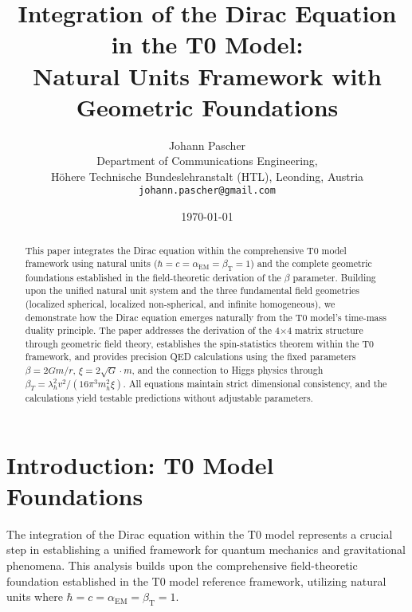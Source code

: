 \documentclass[12pt,a4paper]{article}
\begin{document}
	
	\title{Integration of the Dirac Equation in the T0 Model: \\Natural Units Framework with Geometric Foundations}
	\author{Johann Pascher\\
		Department of Communications Engineering, \\Höhere Technische Bundeslehranstalt (HTL), Leonding, Austria\\
		\texttt{johann.pascher@gmail.com}}
	\date{\today}
	
	\maketitle
	
	\begin{abstract}
		This paper integrates the Dirac equation within the comprehensive T0 model framework using natural units ($\hbar = c = \alpha_{\text{EM}} = \beta_{\text{T}} = 1$) and the complete geometric foundations established in the field-theoretic derivation of the $\beta$ parameter. Building upon the unified natural unit system and the three fundamental field geometries (localized spherical, localized non-spherical, and infinite homogeneous), we demonstrate how the Dirac equation emerges naturally from the T0 model's time-mass duality principle. The paper addresses the derivation of the 4×4 matrix structure through geometric field theory, establishes the spin-statistics theorem within the T0 framework, and provides precision QED calculations using the fixed parameters $\beta = 2Gm/r$, $\xi = 2\sqrt{G} \cdot m$, and the connection to Higgs physics through $\beta_T = \lambda_h^2 v^2/(16\pi^3 m_h^2 \xi)$. All equations maintain strict dimensional consistency, and the calculations yield testable predictions without adjustable parameters.
	\end{abstract}
	
	\newpage
	\tableofcontents
	\newpage
	
	\section{Introduction: T0 Model Foundations}
	\label{sec:introduction}
	
	The integration of the Dirac equation within the T0 model represents a crucial step in establishing a unified framework for quantum mechanics and gravitational phenomena. This analysis builds upon the comprehensive field-theoretic foundation established in the T0 model reference framework, utilizing natural units where $\hbar = c = \alpha_{\text{EM}} = \beta_{\text{T}} = 1$.
	
\end{document}
